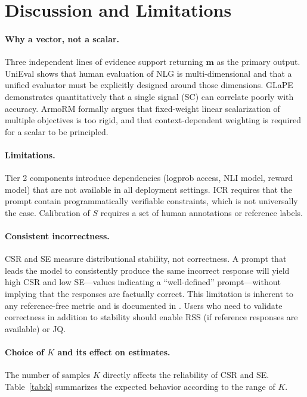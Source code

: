 \documentclass[11pt,a4paper]{article}
\begin{document}
\section{Discussion and Limitations}

\paragraph{Why a vector, not a scalar.}
Three independent lines of evidence support returning $\mathbf{m}$ as the primary output. UniEval \citep{unieval2022} shows that human evaluation of NLG is multi-dimensional and that a unified evaluator must be explicitly designed around those dimensions. GLaPE \citep{glape2024} demonstrates quantitatively that a single signal (SC) can correlate poorly with accuracy. ArmoRM \citep{armorm2024} formally argues that fixed-weight linear scalarization of multiple objectives is too rigid, and that context-dependent weighting is required for a scalar to be principled.

\paragraph{Limitations.}
Tier 2 components introduce dependencies (logprob access, NLI model, reward model) that are not available in all deployment settings. ICR requires that the prompt contain programmatically verifiable constraints, which is not universally the case. Calibration of $S$ requires a set of human annotations or reference labels.

\paragraph{Consistent incorrectness.}
CSR and SE measure distributional stability, not correctness. A prompt that leads the model to consistently produce the same incorrect response will yield high CSR and low SE—values indicating a ``well-defined'' prompt—without implying that the responses are factually correct. This limitation is inherent to any reference-free metric and is documented in \citet{glape2024}. Users who need to validate correctness in addition to stability should enable RSS (if reference responses are available) or JQ.

\paragraph{Choice of $K$ and its effect on estimates.}
The number of samples $K$ directly affects the reliability of CSR and SE. Table~\ref{tab:k} summarizes the expected behavior according to the range of $K$.
\end{document}
